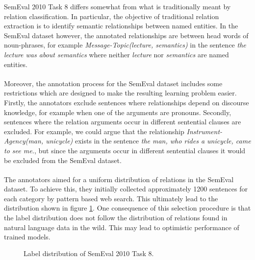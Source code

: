 SemEval 2010 Task 8 differs somewhat from what is traditionally meant by relation classification. In particular, the objective of traditional relation extraction is to identify semantic relationships between named entities. In the SemEval dataset however, the annotated relationships are between head words of noun-phrases, for example \textit{Message-Topic(lecture, semantics)} in the sentence \textit{the lecture was about semantics} where neither \textit{lecture} nor \textit{semantics} are named entities.
\\\\
Moreover, the annotation process for the SemEval dataset includes some restrictions which are designed to make the resulting learning problem easier. Firstly, the annotators exclude sentences where relationships depend on discourse knowledge, for example when one of the arguments are pronouns. Secondly, sentences where the relation arguments occur in different sentential clauses are excluded. For example, we could argue that the relationship \textit{Instrument-Agency(man, unicycle)} exists in the sentence \textit{the man, who rides a unicycle, came to see me.}, but since the arguments occur in different sentential clauses it would be excluded from the SemEval dataset.
\\\\
The annotators aimed for a uniform distribution of relations in the SemEval dataset. To achieve this, they initially collected approximately 1200 sentences for each category by pattern based web search. This ultimately lead to the distribution shown in figure \ref{semeval_dist}. One consequence of this selection procedure is that the label distribution does not follow the distribution of relations found in natural language data in the wild. This may lead to optimistic performance of trained models.

\begin{figure}
	\center
	
	\caption{Label distribution of SemEval 2010 Task 8.}
	\label{semeval_dist}
\end{figure}

